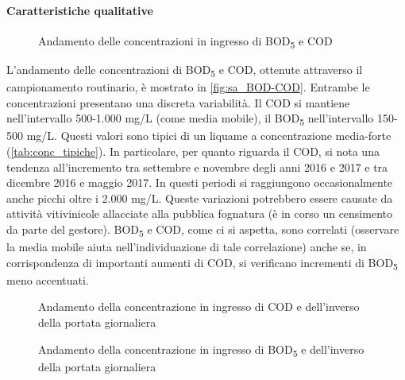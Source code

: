\paragraph{Caratteristiche qualitative}

\begin{figure}[h]
	\centering
	\caption{Andamento delle concentrazioni in ingresso di BOD\textsubscript{5} e COD}
	\label{fig:sa_BOD-COD}
\end{figure}

L’andamento delle concentrazioni di BOD\textsubscript{5} e COD, ottenute attraverso il campionamento routinario, è mostrato in \autoref{fig:sa_BOD-COD}.
Entrambe le concentrazioni presentano una discreta variabilità. Il COD si mantiene nell'intervallo 500-1.000 mg/L (come media mobile), il BOD\textsubscript{5} nell'intervallo 150-500 mg/L. Questi valori sono tipici di un liquame a concentrazione media-forte (\autoref{tab:conc_tipiche}). In particolare, per quanto riguarda il COD, si nota una tendenza all’incremento tra settembre e novembre degli anni 2016 e 2017 e tra dicembre 2016 e maggio 2017. In questi periodi si raggiungono occasionalmente anche picchi oltre i 2.000 mg/L. Queste variazioni potrebbero essere causate da attività vitivinicole allacciate alla pubblica fognatura (è in corso un censimento da parte del gestore).
BOD\textsubscript{5} e COD, come ci si aspetta, sono correlati (osservare la media mobile aiuta nell’individuazione di tale correlazione) anche se, in corrispondenza di importanti aumenti di COD, si verificano incrementi di BOD\textsubscript{5} meno accentuati.

\begin{figure}[H]
	\centering
	\caption{Andamento della concentrazione in ingresso di COD e dell'inverso della portata giornaliera}
	\label{fig:sa_COD-1q}
\end{figure}
\begin{figure}[H]
	\centering
	\caption{Andamento della concentrazione in ingresso di BOD\textsubscript{5} e dell'inverso della portata giornaliera}
	\label{fig:sa_BOD-1q}
\end{figure}

